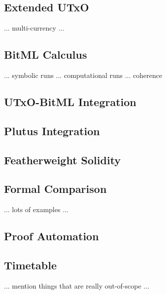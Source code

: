 \documentclass[acmsmall,nonacm=true,screen=true]{acmart}
\begin{document}
\subsection{Extended UTxO}
... multi-currency ... 

\subsection{BitML Calculus}
... symbolic runs ... computational runs ... coherence

\subsection{UTxO-BitML Integration}

\subsection{Plutus Integration}

\subsection{Featherweight Solidity}

\subsection{Formal Comparison}
... lots of examples ...

\subsection{Proof Automation}

\subsection{Timetable}

... mention things that are really out-of-scope ...
\end{document}
